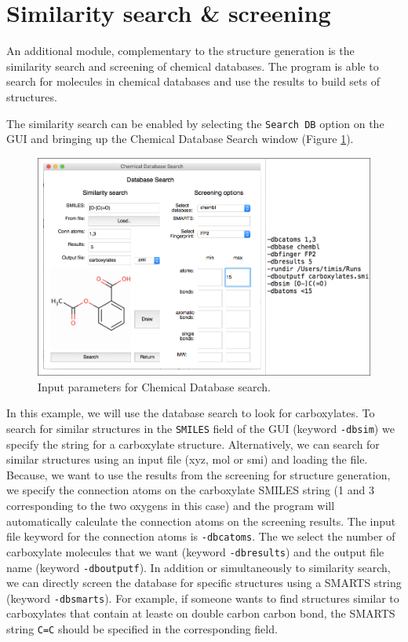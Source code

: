 \documentclass[a4paper,12pt]{assignment}
\begin{document}
\section{Similarity search \& screening}

An additional module, complementary to the structure generation is the similarity search and screening of chemical databases. The program is able to search for molecules in chemical databases and use the results to build sets of structures. 

The similarity search can be enabled by selecting the \texttt{Search DB} option on the GUI and bringing up the Chemical Database Search window (Figure \ref{db1}). 

\begin{figure}[htb!]
\centering
\includegraphics[width=\textwidth]{./Figures/fig14a.png}
\caption{Input parameters for Chemical Database search.}
\label{db1}
\end{figure}

In this example, we will use the database search to look for carboxylates. To search for similar structures in the \texttt{SMILES} field of the GUI (keyword \texttt{-dbsim}) we specify the string for a carboxylate structure. Alternatively, we can search for similar structures using an input file (xyz, mol or smi) and loading the file. Because, we want to use the results from the screening for structure generation, we specify the connection atoms on the carboxylate SMILES string (1 and 3 corresponding to the two oxygens in this case) and the program will automatically calculate the connection atoms on the screening results. The input file keyword for the connection atoms is \texttt{-dbcatoms}. The we select the number of carboxylate molecules that we want (keyword \texttt{-dbresults}) and the output file name (keyword \texttt{-dboutputf}). In addition or simultaneously to similarity search, we can directly screen the database for specific structures using a SMARTS string (keyword \texttt{-dbsmarts}). For example, if someone wants to find structures similar to carboxylates that contain at leaste on double carbon carbon bond, the SMARTS string \texttt{C=C} should be specified in the corresponding field.
\end{document}
